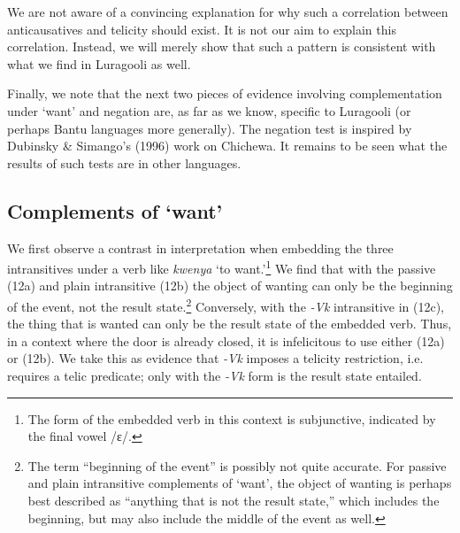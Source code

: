 \documentclass[output=paper]{langsci/langscibook}
\begin{document}
We are not aware of a convincing explanation for why such a correlation between anticausatives and telicity should exist. It is not our aim to explain this correlation. Instead, we will merely show that such a pattern is consistent with what we find in Luragooli as well. 

  Finally, we note that the next two pieces of evidence involving complementation under ‘want’ and negation are, as far as we know, specific to Luragooli (or perhaps Bantu languages more generally). The negation test is inspired by Dubinsky \& Simango’s (1996) work on Chichewa. It remains to be seen what the results of such tests are in other languages. 

\subsection{Complements of ‘want’}

We first observe a contrast in interpretation when embedding the three intransitives under a verb like \textit{kwenya} ‘to want.’\footnote{ The form of the embedded verb in this context is subjunctive, indicated by the final vowel /ɛ/.} We find that with the passive (12a) and plain intransitive (12b) the object of wanting can only be the beginning of the event, not the result state.\footnote{ The term “beginning of the event” is possibly not quite accurate. For passive and plain intransitive complements of ‘want’, the object of wanting is perhaps best described as “anything that is not the result state,” which includes the beginning, but may also include the middle of the event as well. } Conversely, with the \textit{-Vk} intransitive in (12c), the thing that is wanted can only be the result state of the embedded verb. Thus, in a context where the door is already closed, it is infelicitous to use either (12a) or (12b). We take this as evidence that \textit{-Vk} imposes a telicity restriction, i.e. requires a telic predicate; only with the \textit{-Vk} form is the result state entailed.
\end{document}
